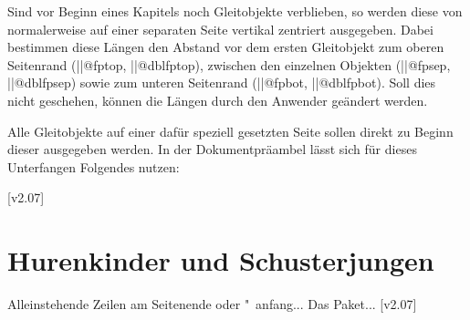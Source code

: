 \begin{Entity}{}
\begin{Declaration}
  {}
\begin{Declaration}
  {}
\begin{Declaration}
  {}
\begin{Declaration}
  {}
\begin{Declaration}
  {}
\begin{Declaration}
  {}
Sind vor Beginn eines Kapitels noch Gleitobjekte verblieben, so werden diese 
von  normalerweise auf einer separaten Seite vertikal zentriert 
ausgegeben. Dabei bestimmen diese Längen den Abstand vor dem ersten Gleitobjekt 
zum oberen Seitenrand (\Length||{@fptop}, \Length||{@dblfptop}), zwischen den 
einzelnen Objekten (\Length||{@fpsep}, \Length||{@dblfpsep}) sowie zum unteren 
Seitenrand (\Length||{@fpbot}, \Length||{@dblfpbot}). Soll dies nicht 
geschehen, können die Längen durch den Anwender geändert werden.
\end{Declaration}
\end{Declaration}
\end{Declaration}
\end{Declaration}
\end{Declaration}
\end{Declaration}
%
\begin{Example}
Alle Gleitobjekte auf einer dafür speziell gesetzten Seite sollen direkt zu 
Beginn dieser ausgegeben werden. In der Dokumentpräambel lässt sich für dieses 
Unterfangen Folgendes nutzen:
\begin{Code}
\makeatletter
\setlength{\@fptop}{0pt}
\setlength{\@dblfptop}{0pt}%
\makeatother
\end{Code}
\end{Example}
\end{Entity}
[v2.07]



\section{Hurenkinder und Schusterjungen}
%
Alleinstehende Zeilen am Seitenende oder "~anfang... Das Paket...
[v2.07]



